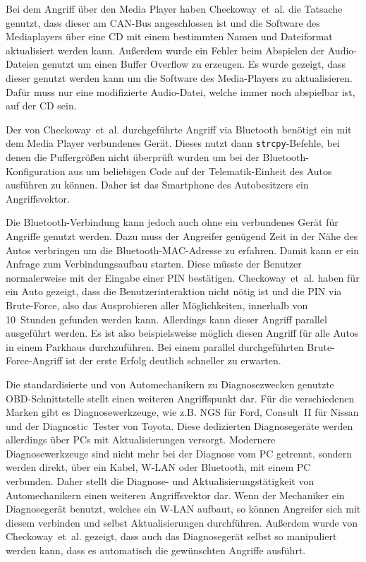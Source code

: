 Bei dem Angriff über den Media Player haben Checkoway~et~al. die Tatsache
genutzt, dass dieser am CAN-Bus angeschlossen ist und die Software des
Mediaplayers über eine CD mit einem bestimmten Namen und Dateiformat
aktualisiert werden kann. Außerdem wurde ein Fehler beim Abspielen der
Audio-Dateien genutzt um einen Buffer Overflow zu erzeugen. Es wurde gezeigt,
dass dieser genutzt werden kann um die Software des Media-Players zu
aktualisieren. Dafür muss nur eine modifizierte Audio-Datei, welche immer noch
abspielbar ist, auf der CD sein.

Der von Checkoway~et~al. durchgeführte Angriff via Bluetooth benötigt ein
mit dem Media Player verbundenes Gerät. Dieses nutzt dann
\verb+strcpy+-Befehle, bei denen die Puffergrößen nicht überprüft wurden um bei
der Bluetooth-Konfiguration aus um beliebigen Code auf der Telematik-Einheit
des Autos ausführen zu können. Daher ist das Smartphone des Autobesitzers ein
Angriffsvektor.

Die Bluetooth-Verbindung kann jedoch auch ohne ein verbundenes Gerät für
Angriffe genutzt werden. Dazu muss der Angreifer genügend Zeit in der Nähe des
Autos verbringen um die Bluetooth-MAC-Adresse zu erfahren. Damit kann er ein
Anfrage zum Verbindungsaufbau starten. Diese müsste der Benutzer normalerweise
mit der Eingabe einer PIN bestätigen. Checkoway~et~al. haben für ein Auto
gezeigt, dass die Benutzerinteraktion nicht nötig ist und die PIN via
Brute-Force, also das Ausprobieren aller Möglichkeiten, innerhalb von
10~Stunden gefunden werden kann. Allerdings kann dieser Angriff parallel
ausgeführt werden. Es ist also beispielsweise möglich diesen Angriff für alle
Autos in einem Parkhaus durchzuführen. Bei einem parallel durchgeführten
Brute-Force-Angriff ist der erste Erfolg deutlich schneller zu erwarten.

Die standardisierte und von Automechanikern zu Diagnosezwecken genutzte
OBD-Schnittstelle stellt einen weiteren Angriffspunkt dar. Für die
verschiedenen Marken gibt es Diagnosewerkzeuge, wie z.B. NGS für Ford,
Consult~II für Nissan und der Diagnostic~Tester von Toyota. Diese dedizierten
Diagnosegeräte werden allerdings über PCs mit Aktualisierungen versorgt.
Modernere Diagnosewerkzeuge sind nicht mehr bei der Diagnose vom PC getrennt,
sondern werden direkt, über ein Kabel, W-LAN oder Bluetooth, mit einem PC
verbunden. Daher stellt die Diagnose- und Aktualisierungstätigkeit von
Automechanikern einen weiteren Angriffsvektor dar. Wenn der Mechaniker ein
Diagnosegerät benutzt, welches ein W-LAN aufbaut, so können Angreifer sich
mit diesem verbinden und selbst Aktualisierungen durchführen. Außerdem wurde
von Checkoway~et~al. gezeigt, dass auch das Diagnosegerät selbst so manipuliert
werden kann, dass es automatisch die gewünschten Angriffe ausführt.

